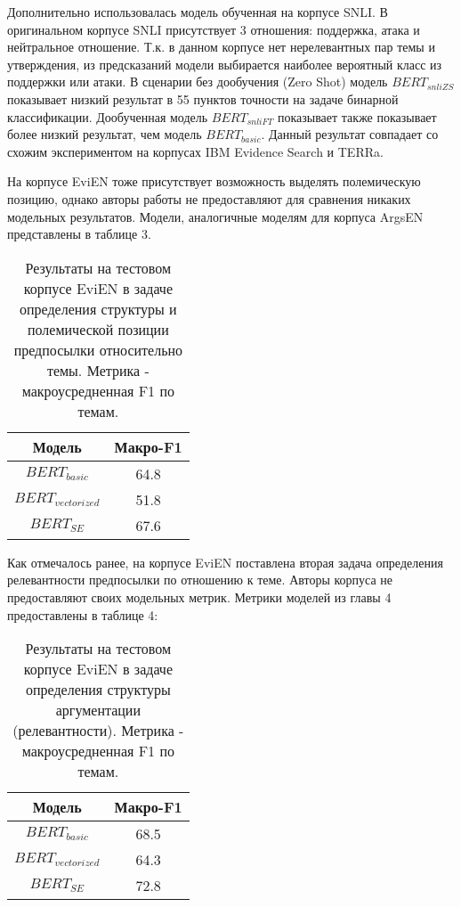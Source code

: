 Дополнительно использовалась модель обученная на корпусе SNLI. В оригинальном корпусе SNLI присутствует 3 отношения: поддержка, атака и нейтральное отношение. Т.к. в данном корпусе нет нерелевантных пар темы и утверждения, из предсказаний модели выбирается наиболее вероятный класс из поддержки или атаки. В сценарии без дообучения (Zero Shot) модель $BERT_{snliZS}$ показывает низкий результат в 55 пунктов точности на задаче бинарной классификации. Дообученная модель $BERT_{snliFT}$ показывает также показывает более низкий результат, чем модель $BERT_{basic}$. Данный результат совпадает со схожим экспериментом на корпусах IBM Evidence Search и TERRa.

На корпусе EviEN тоже присутствует возможность выделять полемическую позицию, однако авторы работы \cite{toledo2020multilingual} не предоставляют для сравнения никаких модельных результатов. Модели, аналогичные моделям для корпуса ArgsEN представлены в таблице 3.

\begin{table}[h!]
\centering
\begin{tabular}{|| c | c |} 
 \hline
 Модель & Макро-F1 \\ [0.5ex] 
 \hline
 $BERT_{basic}$ & 64.8 \\
 $BERT_{vectorized}$ & 51.8 \\
 $BERT_{SE}$ & 67.6 \\
 \hline
\end{tabular}
\caption{Результаты на тестовом корпусе EviEN в задаче определения структуры и полемической позиции предпосылки относительно темы. Метрика - макроусредненная F1 по темам.}
\label{table:1}
\end{table}



Как отмечалось ранее, на корпусе EviEN поставлена вторая задача определения релевантности предпосылки по отношению к теме. Авторы корпуса не предоставляют своих модельных метрик. Метрики моделей из главы 4 предоставлены в таблице 4:

\begin{table}[h!]
\centering
\begin{tabular}{|| c | c |} 
 \hline
 Модель & Макро-F1 \\ [0.5ex] 
 \hline
 $BERT_{basic}$ & 68.5 \\
 $BERT_{vectorized}$ & 64.3 \\
 $BERT_{SE}$ & 72.8 \\
 \hline
\end{tabular}
\caption{Результаты на тестовом корпусе EviEN в задаче определения структуры аргументации (релевантности). Метрика - макроусредненная F1 по темам.}
\label{table:1}
\end{table}

